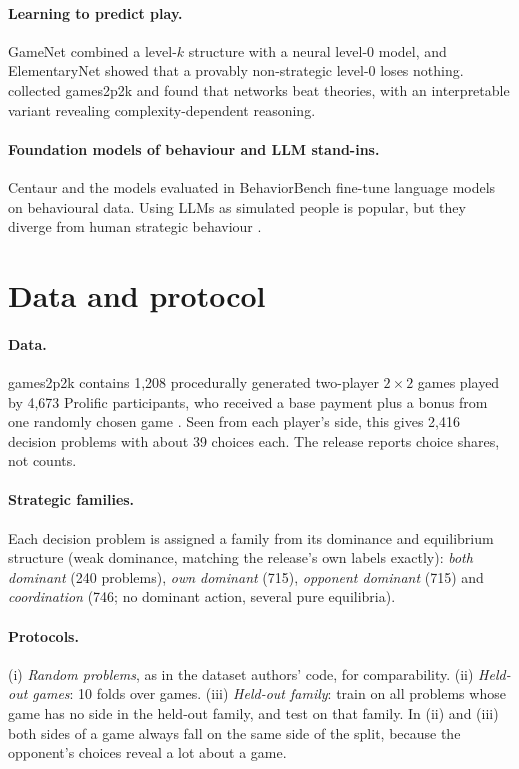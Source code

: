 \documentclass[11pt]{article}
\begin{document}
\paragraph{Learning to predict play.} GameNet \citep{hartford2016deep} combined a level-$k$ structure
with a neural level-0 model, and ElementaryNet \citep{deon2026elementarynet} showed that a provably
non-strategic level-0 loses nothing. \citet{zhu2025capturing} collected games2p2k and found that
networks beat theories, with an interpretable variant revealing complexity-dependent reasoning.

\paragraph{Foundation models of behaviour and LLM stand-ins.} Centaur \citep{binz2025centaur} and the
models evaluated in BehaviorBench \citep{huang2026behaviorbench} fine-tune language models on
behavioural data. Using LLMs as simulated people \citep{horton2023homo} is popular, but they diverge
from human strategic behaviour \citep{wang2026discovering}.

\section{Data and protocol}

\paragraph{Data.} games2p2k contains 1,208 procedurally generated two-player $2\times2$ games played
by 4,673 Prolific participants, who received a base payment plus a bonus from one randomly chosen
game \citep{zhu2025capturing}. Seen from each player's side, this gives 2,416 decision problems with
about 39 choices each. The release reports choice shares, not counts.

\paragraph{Strategic families.} Each decision problem is assigned a family from its dominance and
equilibrium structure (weak dominance, matching the release's own labels exactly): \emph{both
dominant} (240 problems), \emph{own dominant} (715), \emph{opponent dominant} (715) and
\emph{coordination} (746; no dominant action, several pure equilibria).

\paragraph{Protocols.} (i) \emph{Random problems}, as in the dataset authors' code, for
comparability. (ii) \emph{Held-out games}: 10 folds over games. (iii) \emph{Held-out family}: train
on all problems whose game has no side in the held-out family, and test on that family. In (ii) and
(iii) both sides of a game always fall on the same side of the split, because the opponent's
choices reveal a lot about a game.
\end{document}
